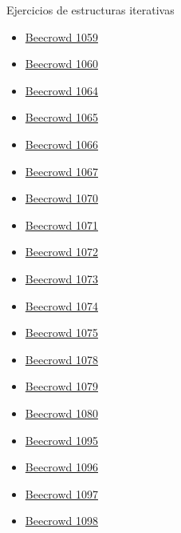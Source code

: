 \documentclass[12pt]{beamer}
\begin{document}
\begin{frame}{Ejercicios de estructuras iterativas}
    \footnotesize\begin{multicols}{3}
        \begin{itemize}
            \item \href{https://judge.beecrowd.com/es/problems/view/1059}{Beecrowd 1059}
            \item \href{https://judge.beecrowd.com/es/problems/view/1060}{Beecrowd 1060}
            \item \href{https://judge.beecrowd.com/es/problems/view/1064}{Beecrowd 1064}
            \item \href{https://judge.beecrowd.com/es/problems/view/1065}{Beecrowd 1065}
            \item \href{https://judge.beecrowd.com/es/problems/view/1066}{Beecrowd 1066}
            \item \href{https://judge.beecrowd.com/es/problems/view/1067}{Beecrowd 1067}
            \item \href{https://judge.beecrowd.com/es/problems/view/1070}{Beecrowd 1070}
            \item \href{https://judge.beecrowd.com/es/problems/view/1071}{Beecrowd 1071}
            \item \href{https://judge.beecrowd.com/es/problems/view/1072}{Beecrowd 1072}
            \item \href{https://judge.beecrowd.com/es/problems/view/1073}{Beecrowd 1073}
            \item \href{https://judge.beecrowd.com/es/problems/view/1074}{Beecrowd 1074}
            \item \href{https://judge.beecrowd.com/es/problems/view/1075}{Beecrowd 1075}
            \item \href{https://judge.beecrowd.com/es/problems/view/1078}{Beecrowd 1078}
            \item \href{https://judge.beecrowd.com/es/problems/view/1079}{Beecrowd 1079}
            \item \href{https://judge.beecrowd.com/es/problems/view/1080}{Beecrowd 1080}
            \item \href{https://judge.beecrowd.com/es/problems/view/1095}{Beecrowd 1095}
            \item \href{https://judge.beecrowd.com/es/problems/view/1096}{Beecrowd 1096}
            \item \href{https://judge.beecrowd.com/es/problems/view/1097}{Beecrowd 1097}
            \item \href{https://judge.beecrowd.com/es/problems/view/1098}{Beecrowd 1098}

\end{itemize}
\end{multicols}
\end{frame}
\end{document}
